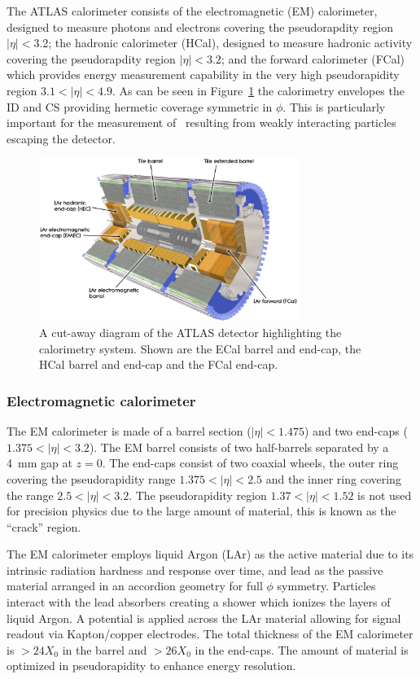 The ATLAS calorimeter consists of the electromagnetic (EM) calorimeter, designed to measure photons and electrons covering the pseudorapdity region $|\eta|<3.2$; the hadronic calorimeter (HCal), designed to measure hadronic activity covering the pseudorapdity region $|\eta|<3.2$; and the forward calorimeter (FCal) which provides energy measurement capability in the very high pseudorapidity region $3.1<|\eta|<4.9$. As can be seen in Figure~\ref{fig:ATLASCalorimetryOverall} the calorimetry envelopes the ID and CS providing hermetic coverage symmetric in $\phi$. This is particularly important for the measurement of \met\ resulting from weakly interacting particles escaping the detector.

\begin{figure}[htbp]
  \centering
  \includegraphics[width=0.75\textwidth]{PartDetector/Diagrams/ATLAS_Calorimetry.eps}
  \caption{A cut-away diagram of the ATLAS detector highlighting the calorimetry system. Shown are the ECal barrel and end-cap, the HCal barrel and end-cap and the FCal end-cap.}
  \label{fig:ATLASCalorimetryOverall}
\end{figure}

\subsubsection{Electromagnetic calorimeter}
The EM calorimeter is made of a barrel section ($|\eta|<1.475$) and two end-caps ($1.375<|\eta|<3.2$). The EM barrel consists of two half-barrels separated by a \SI{4}{\mm} gap at $z=0$. The end-caps consist of two coaxial wheels, the outer ring covering the pseudorapidity range $1.375<|\eta|<2.5$ and the inner ring covering the range $2.5<|\eta|<3.2$. The pseudorapidity region $1.37<|\eta|<1.52$ is not used for precision physics due to the large amount of material, this is known as the ``crack'' region.

The EM calorimeter employs liquid Argon (LAr) as the active material due to its intrinsic radiation hardness and response over time, and lead as the passive material arranged in an accordion geometry for full $\phi$ symmetry. Particles interact with the lead absorbers creating a shower which ionizes the layers of liquid Argon. A potential is applied across the LAr material allowing for signal readout via Kapton/copper electrodes. The total thickness of the EM calorimeter is $>24X_{0}$ in the barrel and $>26X_{0}$ in the end-caps. The amount of material is optimized in pseudorapidity to enhance energy resolution.

